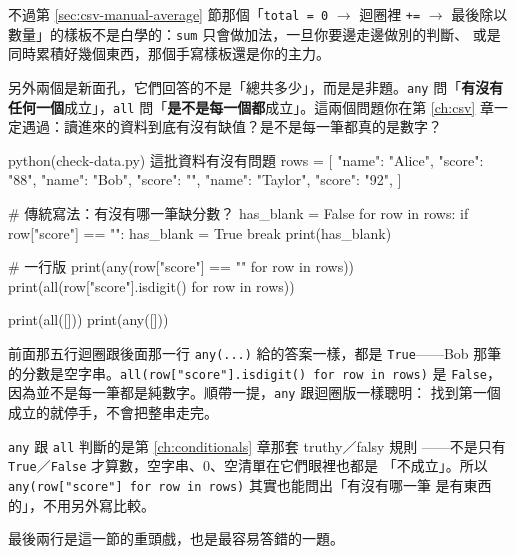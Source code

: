 不過第 \ref{sec:csv-manual-average} 節那個「\texttt{total = 0} $\to$ 迴圈裡 \texttt{+=} $\to$
最後除以數量」的樣板不是白學的：\texttt{sum} 只會做加法，一旦你要邊走邊做別的判斷、
或是同時累積好幾個東西，那個手寫樣板還是你的主力。

另外兩個是新面孔，它們回答的不是「總共多少」，而是是非題。\texttt{any} 問「\textbf{有沒有
任何一個}成立」，\texttt{all} 問「\textbf{是不是每一個都}成立」。這兩個問題你在第
\ref{ch:csv} 章一定遇過：讀進來的資料到底有沒有缺值？是不是每一筆都真的是數字？

\begin{example}{python}{(check-data.py) 這批資料有沒有問題}
rows = [
    {"name": "Alice", "score": "88"},
    {"name": "Bob", "score": ""},
    {"name": "Taylor", "score": "92"},
]

# 傳統寫法：有沒有哪一筆缺分數？
has_blank = False
for row in rows:
    if row["score"] == "":
        has_blank = True
        break
print(has_blank)

# 一行版
print(any(row["score"] == "" for row in rows))
print(all(row["score"].isdigit() for row in rows))

print(all([]))
print(any([]))
\end{example}


前面那五行迴圈跟後面那一行 \texttt{any(...)} 給的答案一樣，都是 \texttt{True}——Bob 那筆
的分數是空字串。\texttt{all(row["score"].isdigit() for row in rows)} 是
\texttt{False}，因為並不是每一筆都是純數字。順帶一提，\texttt{any} 跟迴圈版一樣聰明：
找到第一個成立的就停手，不會把整串走完。

\texttt{any} 跟 \texttt{all} 判斷的是第 \ref{ch:conditionals} 章那套 truthy／falsy 規則
——不是只有 \texttt{True}／\texttt{False} 才算數，空字串、0、空清單在它們眼裡也都是
「不成立」。所以 \texttt{any(row["score"] for row in rows)} 其實也能問出「有沒有哪一筆
是有東西的」，不用另外寫比較。

最後兩行是這一節的重頭戲，也是最容易答錯的一題。


